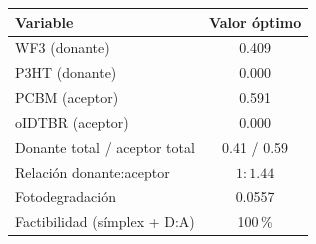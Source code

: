\begin{tabular}{l c}
\hline
Variable & Valor óptimo \\
\hline
WF3 (donante) & 0.409 \\
P3HT (donante) & 0.000 \\
PCBM (aceptor) & 0.591 \\
oIDTBR (aceptor) & 0.000 \\
\hline
Donante total / aceptor total & 0.41 / 0.59 \\
Relación donante:aceptor & $1:1.44$ \\
Fotodegradación & 0.0557 \\
Factibilidad (símplex + D:A) & 100\,\% \\
\hline
\end{tabular}